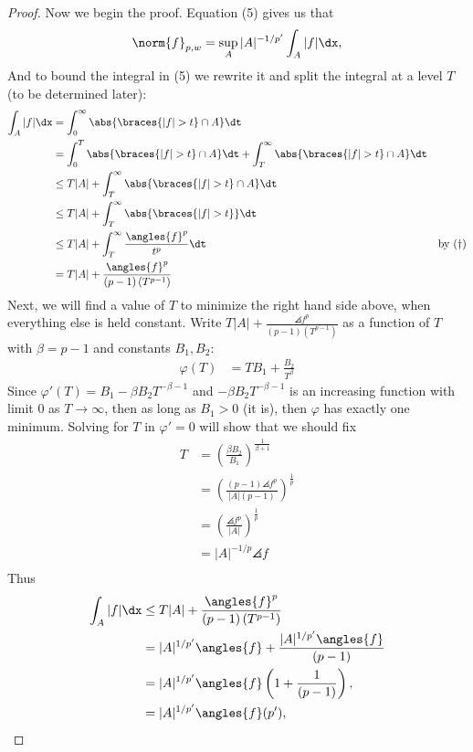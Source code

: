 \documentclass[12pt,letterpaper]{article}
\renewcommand{\phi}{\varphi}
\begin{document}
\begin{enumerate}
\begin{proof}
Now we begin the proof. Equation (5) gives us that 
\setcounter{equation}{4}
\begin{equation}
\norm{f}_{p,w}=\sup_A |A|^{-1/p'} \int_A |f| \dx,
\end{equation}
And to bound the integral in (5) we rewrite it and split the integral at a level $T$ (to be determined later):
\begin{align*}
\int_A |f| \dx
&=\int_0^\infty \abs{\braces{|f|>t}\cap A} \dt \\
&=\int_0^T \abs{\braces{|f|>t}\cap A} \dt + \int_T^\infty \abs{\braces{|f|>t}\cap A} \dt\\
&\leq T|A| + \int_T^\infty \abs{\braces{|f|>t}\cap A} \dt\\
&\leq T|A| + \int_T^\infty \abs{\braces{|f|>t}} \dt\\
&\leq T|A| + \int_T^\infty \frac{\angles{f}^p}{t^p} \dt & \text{by }(\dagger)\\
&= T|A| + \frac{\angles{f}^p}{(p-1)\left(T^{p-1}\right)} \\
\end{align*}
Next, we will find a value of $T$ to minimize the right hand side above, when everything else is held constant. Write $T|A| + \frac{\angles{f}^p}{(p-1)\left(T^{p-1}\right)}$ as a function of $T$ with $\beta=p-1$ and constants $B_1, B_2$:
\begin{align*}
\phi(T) %
&= TB_1 + \frac{B_2}{T^{\beta}}
\end{align*}
Since $\phi'(T)=B_1-\beta B_2 T^{-\beta-1}$ and $-\beta B_2 T^{-\beta-1}$ is an increasing function with limit 0 as $T\to\infty$, then as long as $B_1>0$ (it is), then $\phi$ has exactly one minimum. Solving for $T$ in $\phi'=0$ will show that we should fix 
\begin{align*}
T&=\left(\frac{\beta B_2}{B_1}\right)^{\frac{1}{\beta+1}}\\
&=\left(\frac{(p-1) \angles{f}^p}{|A|(p-1)}\right)^{\frac{1}{p}}\\
&=\left(\frac{ \angles{f}^p}{|A|}\right)^{\frac{1}{p}}\\
&={|A|^{-1/p}}{ \angles{f}}\\
\end{align*}
Thus 
\begin{align*}
\int_A |f| \dx
&\leq T|A| + \frac{\angles{f}^p}{(p-1)\left(T^{p-1}\right)} \\
&=|A|^{1/p'}\angles{f} + \frac{|A|^{1/p'}\angles{f}}{(p-1)} \\
&=|A|^{1/p'}\angles{f} \left(1 + \frac{1}{(p-1)} \right), \\
&=|A|^{1/p'}\angles{f} (p'), 
\end{align*}


\end{proof}
\end{enumerate}
\end{document}
